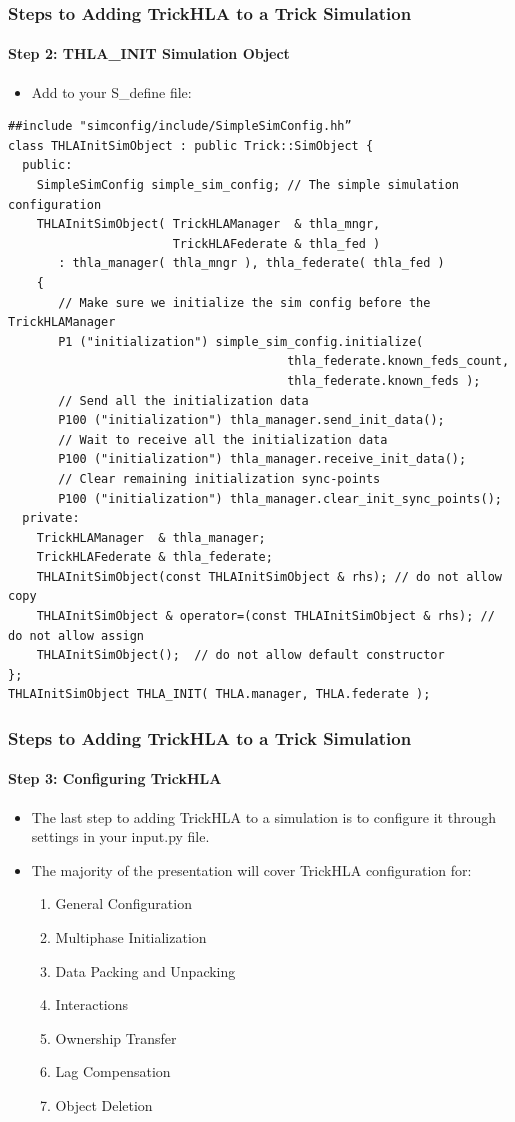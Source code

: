\documentclass{beamer}
\begin{document}
   \begin{frame}[fragile]
      \frametitle{Steps to Adding TrickHLA to a Trick Simulation}
      \framesubtitle{Step 2: THLA\_INIT Simulation Object}
      \begin{itemize}
         \item Add to your S\_define file:
      \end{itemize}
\begin{Verbatim}[frame=single, fontsize=\tiny]
##include "simconfig/include/SimpleSimConfig.hh”
class THLAInitSimObject : public Trick::SimObject {
  public:
    SimpleSimConfig simple_sim_config; // The simple simulation configuration
    THLAInitSimObject( TrickHLAManager  & thla_mngr,
                       TrickHLAFederate & thla_fed )
       : thla_manager( thla_mngr ), thla_federate( thla_fed )
    {
       // Make sure we initialize the sim config before the TrickHLAManager
       P1 ("initialization") simple_sim_config.initialize(
                                       thla_federate.known_feds_count,
                                       thla_federate.known_feds ); 
       // Send all the initialization data
       P100 ("initialization") thla_manager.send_init_data();
       // Wait to receive all the initialization data
       P100 ("initialization") thla_manager.receive_init_data();
       // Clear remaining initialization sync-points
       P100 ("initialization") thla_manager.clear_init_sync_points();
  private:
    TrickHLAManager  & thla_manager;
    TrickHLAFederate & thla_federate;
    THLAInitSimObject(const THLAInitSimObject & rhs); // do not allow copy
    THLAInitSimObject & operator=(const THLAInitSimObject & rhs); // do not allow assign
    THLAInitSimObject();  // do not allow default constructor
};
THLAInitSimObject THLA_INIT( THLA.manager, THLA.federate );
\end{Verbatim}
   \end{frame}
   
   \begin{frame}
      \frametitle{Steps to Adding TrickHLA to a Trick Simulation}
      \framesubtitle{Step 3: Configuring TrickHLA}
      \begin{itemize}
         \item The last step to adding TrickHLA to a simulation is to configure
         it through settings in your input.py file.
         \item The majority of the presentation will cover TrickHLA configuration for:
      \begin{enumerate}
         \item General Configuration
         \item Multiphase Initialization
         \item Data Packing and Unpacking
         \item Interactions
         \item Ownership Transfer
         \item Lag Compensation
         \item Object Deletion 
      \end{enumerate}
      \end{itemize}
   \end{frame}
   
\end{document}
